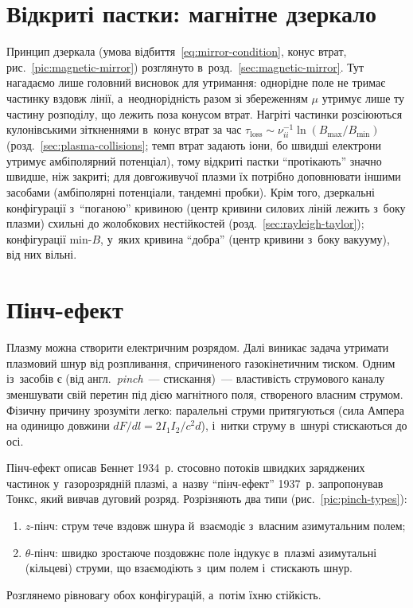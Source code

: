 
\section{Відкриті пастки: магнітне дзеркало}

Принцип дзеркала (умова відбиття~\eqref{eq:mirror-condition}, конус втрат, рис.~\ref{pic:magnetic-mirror})
розглянуто в~розд.~\ref{sec:magnetic-mirror}. Тут нагадаємо лише головний висновок для утримання:
однорідне поле не тримає частинку вздовж лінії, а~неоднорідність разом зі збереженням $\mu$
утримує лише ту частину розподілу, що лежить поза конусом втрат. Нагріті частинки
розсіюються кулонівськими зіткненнями в~конус втрат за час
$\tau_\mathrm{loss}\sim\nu_{ii}^{-1}\ln(B_{\max}/B_{\min})$ (розд.~\ref{sec:plasma-collisions}; темп втрат
задають іони, бо швидші електрони утримує амбіполярний потенціал), тому відкриті пастки \enquote{протікають} значно швидше, ніж закриті; для довгоживучої
плазми їх потрібно доповнювати іншими засобами (амбіполярні потенціали, тандемні пробки).
Крім того, дзеркальні конфігурації з~\enquote{поганою} кривиною (центр кривини силових ліній
лежить з~боку плазми) схильні до жолобкових нестійкостей (розд.~\ref{sec:rayleigh-taylor}); конфігурації min-$B$, у~яких кривина
\enquote{добра} (центр кривини з~боку вакууму), від них вільні.


\section{Пінч-ефект}

Плазму можна створити електричним розрядом. Далі виникає задача утримати плазмовий шнур
від розпливання, спричиненого газокінетичним тиском. Одним із~засобів є 
(від англ.~\emph{pinch}~--- стискання)~--- властивість струмового каналу зменшувати свій
перетин під дією магнітного поля, створеного власним струмом. Фізичну причину зрозуміти
легко: паралельні струми притягуються (сила Ампера на одиницю довжини
$dF/dl=2I_1I_2/c^2d$), і~нитки струму в~шнурі стискаються до осі.

Пінч-ефект описав Беннет 1934~р. стосовно потоків швидких заряджених частинок
у~газорозрядній плазмі, а~назву \enquote{пінч-ефект} 1937~р. запропонував Тонкс, який
вивчав дуговий розряд. Розрізняють два типи (рис.~\ref{pic:pinch-types}):
\begin{enumerate}
	\item $z$-пінч: струм тече вздовж шнура й~взаємодіє з~власним азимутальним полем;
	\item $\theta$-пінч: швидко зростаюче поздовжнє поле індукує в~плазмі азимутальні
	  (кільцеві) струми, що взаємодіють з~цим полем і~стискають шнур.
\end{enumerate}
Розглянемо рівновагу обох конфігурацій, а~потім їхню стійкість.

